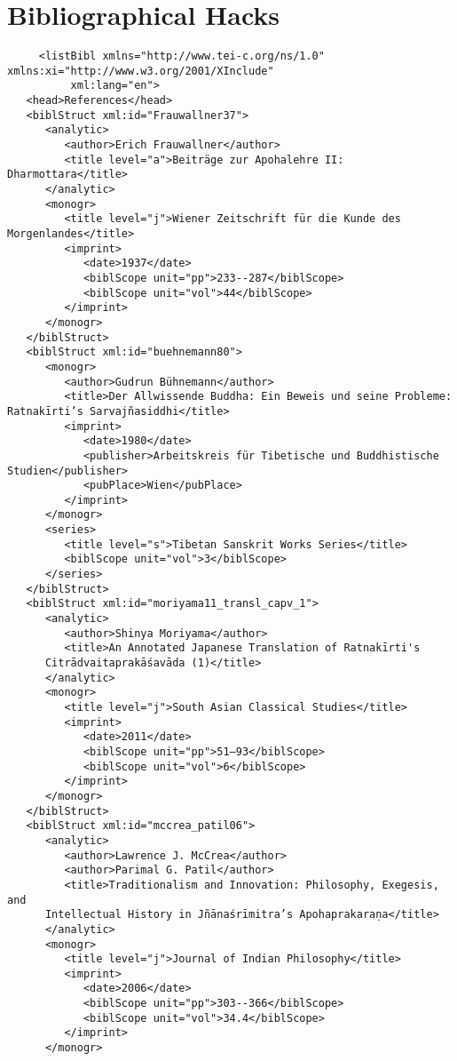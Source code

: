 \documentclass[article,a4paper]{memoir}
\begin{document}
       \chapter{Bibliographical Hacks}
       \begin{verbatim}
     <listBibl xmlns="http://www.tei-c.org/ns/1.0" xmlns:xi="http://www.w3.org/2001/XInclude"
          xml:lang="en">
   <head>References</head>
   <biblStruct xml:id="Frauwallner37">
      <analytic>
         <author>Erich Frauwallner</author>
         <title level="a">Beiträge zur Apohalehre II: Dharmottara</title>
      </analytic>
      <monogr>
         <title level="j">Wiener Zeitschrift für die Kunde des Morgenlandes</title>
         <imprint>
            <date>1937</date>
            <biblScope unit="pp">233--287</biblScope>
            <biblScope unit="vol">44</biblScope>
         </imprint>
      </monogr>
   </biblStruct>
   <biblStruct xml:id="buehnemann80">
      <monogr>
         <author>Gudrun Bühnemann</author>
         <title>Der Allwissende Buddha: Ein Beweis und seine Probleme: Ratnakīrti’s Sarvajñasiddhi</title>
         <imprint>
            <date>1980</date>
            <publisher>Arbeitskreis für Tibetische und Buddhistische Studien</publisher>
            <pubPlace>Wien</pubPlace>
         </imprint>
      </monogr>
      <series>
         <title level="s">Tibetan Sanskrit Works Series</title>
         <biblScope unit="vol">3</biblScope>
      </series>
   </biblStruct>
   <biblStruct xml:id="moriyama11_transl_capv_1">
      <analytic>
         <author>Shinya Moriyama</author>
         <title>An Annotated Japanese Translation of Ratnakīrti's
      Citrādvaitaprakāśavāda (1)</title>
      </analytic>
      <monogr>
         <title level="j">South Asian Classical Studies</title>
         <imprint>
            <date>2011</date>
            <biblScope unit="pp">51–93</biblScope>
            <biblScope unit="vol">6</biblScope>
         </imprint>
      </monogr>
   </biblStruct>
   <biblStruct xml:id="mccrea_patil06">
      <analytic>
         <author>Lawrence J. McCrea</author>
         <author>Parimal G. Patil</author>
         <title>Traditionalism and Innovation: Philosophy, Exegesis, and
      Intellectual History in Jñānaśrīmitra’s Apohaprakaraṇa</title>
      </analytic>
      <monogr>
         <title level="j">Journal of Indian Philosophy</title>
         <imprint>
            <date>2006</date>
            <biblScope unit="pp">303--366</biblScope>
            <biblScope unit="vol">34.4</biblScope>
         </imprint>
      </monogr>

\end{verbatim}
\end{document}
